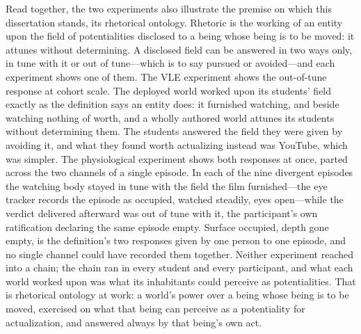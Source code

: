 Read together, the two experiments also illustrate the premise on which this dissertation
stands, its rhetorical ontology. Rhetoric is the working of an entity upon the field of
potentialities disclosed to a being whose being is to be moved: it attunes without
determining. A disclosed field can be answered in two ways only, in tune with it or out of
tune---which is to say pursued or avoided---and each experiment shows one of them. The VLE
experiment shows the out-of-tune response at cohort scale. The deployed world worked upon its
students' field exactly as the definition says an entity does: it furnished watching, and
beside watching nothing of worth, and a wholly authored world attunes its students without
determining them. The students answered the field they were given by avoiding it, and what
they found worth actualizing instead was YouTube, which was simpler. The physiological
experiment shows both responses at once, parted across the two channels of a single episode.
In each of the nine divergent episodes the watching body stayed in tune with the field the
film furnished---the eye tracker records the episode as occupied, watched steadily, eyes
open---while the verdict delivered afterward was out of tune with it, the participant's own
ratification declaring the same episode empty. Surface occupied, depth gone empty, is the
definition's two responses given by one person to one episode, and no single channel could
have recorded them together. Neither experiment reached into a chain; the chain ran in every
student and every participant, and what each world worked upon was what its inhabitants could
perceive as potentialities. That is rhetorical ontology at work: a world's power over a being whose being is
to be moved, exercised on what that being can perceive as a potentiality for actualization, and
answered always by that being's own act.
